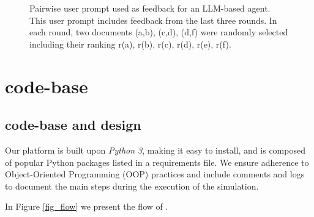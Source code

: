 \begin{figure*}[t]
\centering

\caption{Pairwise user prompt used as feedback for an LLM-based agent. This user prompt includes feedback from the last three rounds. In each round, two documents (a,b), (c,d), (d,f) were randomly selected including their ranking r(a), r(b), r(c), r(d), r(e), r(f).}
\label{prompt_pairwise}
\end{figure*}

\section{{\platformName} code-base}\label{appendix_code-base}
\subsection{{\platformName} code-base and design}\label{appendix_code-base_design}
Our platform is built upon \textit{Python 3}, making it easy to install, and is composed of popular Python packages listed in a requirements file. We ensure adherence to Object-Oriented Programming (OOP) practices and include comments and logs to document the main steps during the execution of the simulation.

In Figure \ref{fig_flow} we present the flow of \platformName.




